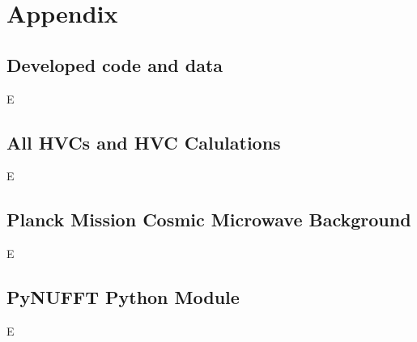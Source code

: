 \setcounter{chapter}{7}
\setcounter{section}{0}

\renewcommand*{\thechapter}{}

\appendix

\chapter{Appendix}
\label{cha:appendix}

\renewcommand*{\thesection}{\Alph{section}}

\section{Developed code and data}
\label{sec:appendixA}

E

\section{All HVCs and HVC Calulations}
\label{sec:appendixB}

E

\section{Planck Mission Cosmic Microwave Background}
\label{sec:appendixC}

E

\section{PyNUFFT Python Module}
\label{sec:appendixD}

E